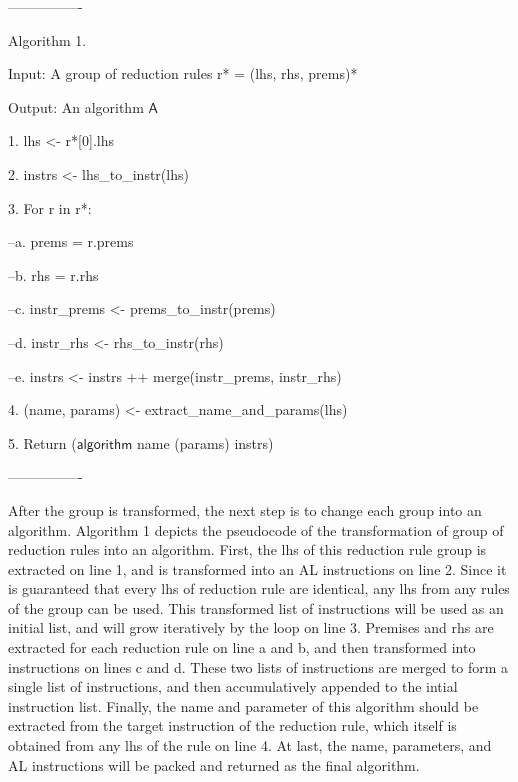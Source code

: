 ----------------

Algorithm 1.

Input: A group of reduction rules r* = (lhs, rhs, prems)*

Output: An algorithm $\mathsf{A}$

1. lhs <- r*[0].lhs

2. instrs <- lhs\_to\_instr(lhs)

3. For r in r*:

--a. prems = r.prems

--b. rhs = r.rhs

--c. instr\_prems <- prems\_to\_instr(prems)

--d. instr\_rhs <- rhs\_to\_instr(rhs)

--e. instrs <- instrs ++ merge(instr\_prems, instr\_rhs)

4. (name, params) <- extract\_name\_and\_params(lhs)

5. Return ($\mathsf{algorithm}$ name (params) {instrs})

----------------



After the group is transformed, the next step is to
change each group into an algorithm. Algorithm 1 depicts the pseudocode of the transformation
of group of reduction rules into an algorithm.
First, the lhs of this reduction rule group is extracted on line 1, and is transformed into
an AL instructions on line 2. Since it is guaranteed that every lhs of reduction rule are
identical, any lhs from any rules of the group can be used. This transformed list of instructions
will be used as an initial list, and will grow iteratively by the loop on line 3.
Premises and rhs are extracted for each reduction rule on line a and b, and then transformed into
instructions on lines c and d. These two lists of instructions are merged to form a single
list of instructions, and then accumulatively appended to the intial instruction list.
Finally, the name and parameter of this algorithm should be extracted from the target instruction of the reduction rule,
which itself is obtained from any lhs of the rule on line 4. At last, the name, parameters, and
AL instructions will be packed and returned as the final algorithm.

